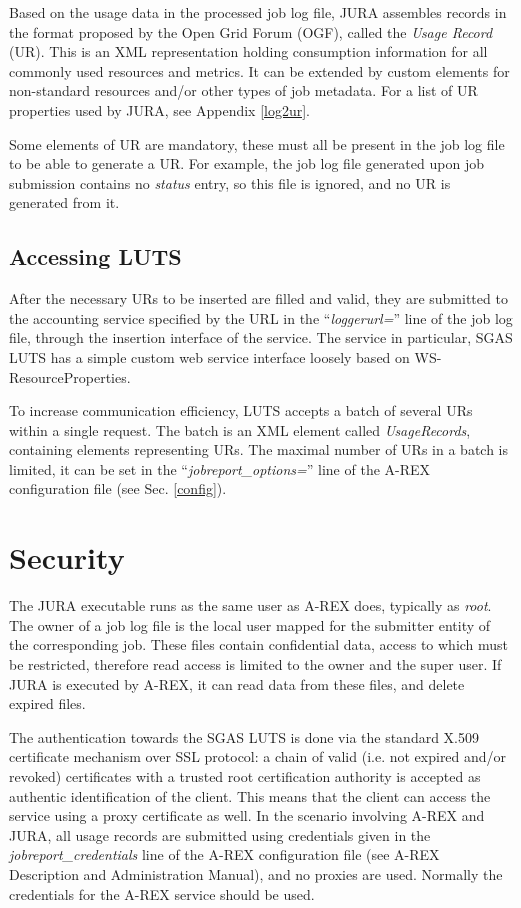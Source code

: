 \documentclass{article}                            %
\begin{document}
Based on the usage data in the processed job log file, JURA assembles
records in the format proposed by the Open Grid Forum (OGF), called
the \textit{Usage Record} (UR)\cite{ur}. This is an XML representation
holding consumption information for all commonly used resources and
metrics. It can be extended by custom elements for non-standard
resources and/or other types of job metadata. For a list of UR
properties used by JURA, see Appendix \ref{log2ur}.

Some elements of UR are mandatory, these must all be present in the
job log file to be able to generate a UR. For example, the job log
file generated upon job submission contains no \textit{status} entry,
so this file is ignored, and no UR is generated from it.

\subsection{Accessing LUTS}
\label{accessing}
After the necessary URs to be inserted are filled and valid, they are
submitted to the accounting service specified by the URL in the
``\textit{loggerurl=}'' line of the job log file, through the
insertion interface of the service. The service in particular, SGAS
LUTS has a simple custom web service interface loosely based on
WS-ResourceProperties\cite{wsrp}.

To increase communication efficiency, LUTS accepts a batch of several
URs within a single request. The batch is an XML element called
\textit{UsageRecords}, containing elements representing URs. The
maximal number of URs in a batch is limited, it can be set in the
``\textit{jobreport\_options=}'' line of the A-REX configuration file
(see Sec. \ref{config}).

\section{Security}
The JURA executable runs as the same user as A-REX does, typically as
\textit{root}. The owner of a job log file is the local user mapped
for the submitter entity of the corresponding job. These files contain
confidential data, access to which must be restricted, therefore read
access is limited to the owner and the super user. If JURA is executed
by A-REX, it can read data from these files, and delete expired files.

The authentication towards the SGAS LUTS is done via the standard
X.509 certificate mechanism over SSL protocol: a chain of valid
(i.e. not expired and/or revoked) certificates with a trusted root
certification authority is accepted as authentic identification of the
client. This means that the client can access the service using a
proxy certificate as well. In the scenario involving A-REX and JURA,
all usage records are submitted using credentials given in the
\textit{jobreport\_credentials} line of the A-REX configuration file
(see A-REX Description and Administration Manual\cite{arex}), and no
proxies are used. Normally the credentials for the A-REX service
should be used.
\end{document}
